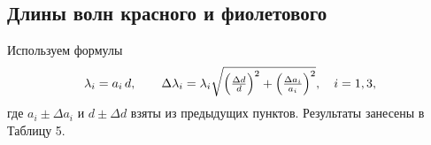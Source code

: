 \subsection*{Длины волн красного и фиолетового}

Используем формулы
\[
	\lambda_i = a_i\,d,
	\qquad
	\Delta\lambda_i = \lambda_i
	\sqrt{\Bigl(\tfrac{\Delta d}{d}\Bigr)^2 + \Bigl(\tfrac{\Delta a_i}{a_i}\Bigr)^2},
	\quad i = 1,3,
\]
где \(a_i\pm\Delta a_i\) и \(d\pm\Delta d\) взяты из предыдущих пунктов.
Результаты занесены в Таблицу 5.
